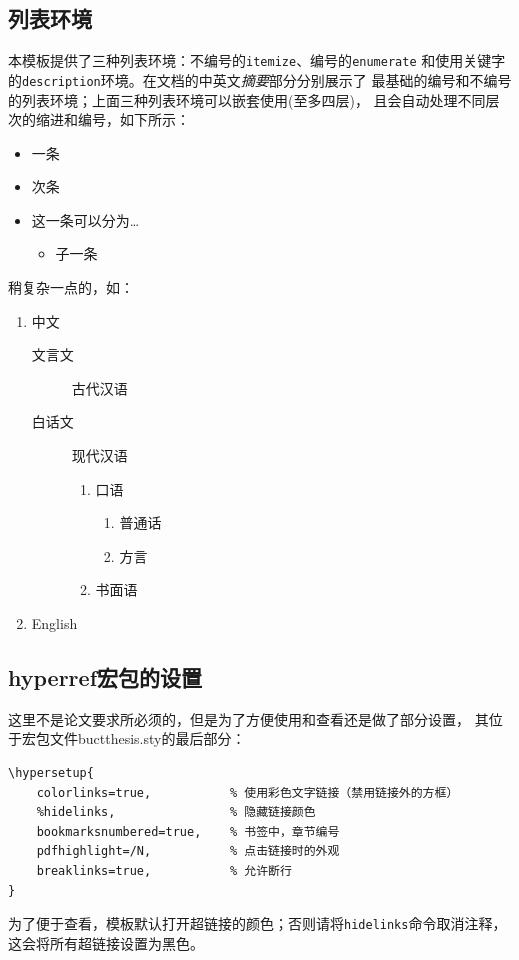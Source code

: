    \subsection{列表环境}\label{subsec:items}
	本模板提供了三种列表环境：不编号的\texttt{itemize}、编号的\texttt{enumerate}
	和使用关键字的\texttt{description}环境。在文档的中英文\emph{摘要}部分分别展示了
	最基础的编号和不编号的列表环境；上面三种列表环境可以嵌套使用(至多四层)，
	且会自动处理不同层次的缩进和编号，如下所示：
    \begin{itemize}
        \item 一条
        \item 次条
        \item 这一条可以分为\dots
            \begin{itemize}
            \item 子一条
            \end{itemize}
        \end{itemize}
    稍复杂一点的，如：
        \begin{enumerate}
            \item 中文
            \begin{description}
                \item[文言文] 古代汉语
                \item[白话文] 现代汉语
                \begin{enumerate}
                    \item 口语
                        \begin{enumerate}
                            \item 普通话
                            \item 方言
                        \end{enumerate}
                    \item 书面语
                    \end{enumerate}
            \end{description}
            \item English
        \end{enumerate}

    \subsection{\textsf{hyperref}宏包的设置}
	这里不是论文要求所必须的，但是为了方便使用和查看还是做了部分设置，
	其位于宏包文件\textsf{buctthesis.sty}的最后部分：
    \begin{lstlisting}[firstnumber=428]
\hypersetup{
    colorlinks=true,           % 使用彩色文字链接（禁用链接外的方框）
    %hidelinks,                % 隐藏链接颜色
    bookmarksnumbered=true,    % 书签中，章节编号
    pdfhighlight=/N,           % 点击链接时的外观
    breaklinks=true,           % 允许断行
}
    \end{lstlisting}
	为了便于查看，模板默认打开超链接的颜色；否则请将\texttt{hidelinks}命令取消注释，
	这会将所有超链接设置为黑色。